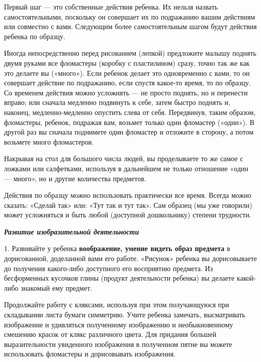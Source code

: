 \documentclass[a5paper]{book}
\renewcommand{\emph}[1]{\textit{#1}}
\begin{document}
Первый шаг --- это собственные действия ребенка. Их нельзя назвать
самостоятельными, поскольку он совершает их по подражанию вашим
действиям или совместно с вами. Следующим более самостоятельным шагом
будут действия ребенка по образцу.

Иногда непосредственно перед рисованием (лепкой) предложите малышу
поднять двумя руками все фломастеры (коробку с пластилином) сразу, точно
так же как это делаете вы («много»). Если ребенок делает это
одновременно с вами, то он совершает действие по подражанию, если спустя
какое-то время, то по образцу. Со временем действия можно усложнять ---
не просто поднять, но и перенести вправо; или сначала медленно подвинуть
к себе, затем быстро поднять и, наконец, медленно-медленно опустить
слева от себя. Передвинув, таким образом, фломастеры, ребенок, подражая
вам, возьмет только один фломастер («один»). В другой раз вы сначала
поднимете один фломастер и отложите в сторону, а потом возьмете много
фломастеров.

Накрывая на стол для большого числа людей, вы проделываете то же самое с
ложками или салфетками, используя в дальнейшем не только отношение «один
--- много», но и другие количества предметов.

Действия по образцу можно использовать практически все время. Всегда
можно сказать: «Сделай так» или: «Тут так и тут так». Сам образец (мы
уже говорили) может усложняться и быть любой (доступной дошкольнику)
степени трудности.

\emph{\textbf{Развитие изобразительной деятельности}}

1. Развивайте у ребенка \textbf{воображение, умение видеть образ
предмета} в дорисованной, доделанной вами его работе. «Рисунок» ребенка
вы дорисовываете до получения какого-либо доступного его восприятию
предмета. Из бесформенных кусочков глины (продукт деятельности ребенка)
вы делаете какой-либо знакомый ему предмет.

Продолжайте работу с кляксами, используя при этом получающуюся при
складывании листа бумаги симметрию. Учите ребенка замечать, высматривать
изображение и удивляться полученному изображению и необыкновенному
смешению красок от клякс различного цвета. Для придания большей
выразительности увиденного изображения в полученном пятне вы можете
использовать фломастеры и дорисовывать изображения.
\end{document}
